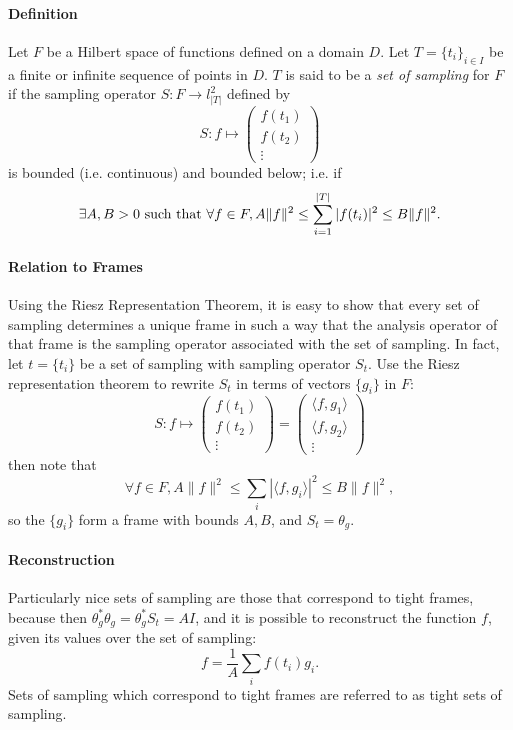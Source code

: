\documentclass[12pt]{article}
\begin{document}
\paragraph{Definition}
Let $F$ be a Hilbert space of functions defined on a domain $D$. Let $T = \{t_i\}_{i\in I}$ be a finite or infinite sequence of points in $D$. $T$ is said to be a \emph{set of sampling} for $F$ if the sampling operator $S: F \rightarrow l^2_{|T|}$ defined by 
$$ 
S: f \mapsto 
\begin{pmatrix}
f(t_1) \\
f(t_2) \\
\vdots 
\end{pmatrix}
$$
is bounded (i.e. continuous) and bounded below; i.e. if 
$$\exists A,B>0 \hbox{ such that } \forall f \in F, A\|f\|^2 \leq \sum_{i=1}^{|T|} |f(t_i)|^2 \leq B \|f\|^2.$$

\paragraph{Relation to Frames}
Using the Riesz Representation Theorem, it is easy to show that every set of sampling determines a unique frame in such a way that the analysis operator of that frame is the sampling operator associated with the set of sampling. In fact, let $t=\{t_i\}$ be a set of sampling with sampling operator $S_t$. Use the Riesz representation theorem to rewrite $S_t$ in terms of vectors $\{g_i\}$ in $F$:
$$ 
S: f \mapsto 
\begin{pmatrix}
f(t_1) \\
f(t_2) \\
\vdots
\end{pmatrix}
=
\begin{pmatrix}
\langle f, g_1 \rangle \\
\langle f, g_2 \rangle \\
\vdots
\end{pmatrix}
$$
then note that 
$$ \forall f\in F, A\|f\|^2 \leq \sum_{i} \left| \langle f, g_i \rangle \right|^2 \leq B\|f\|^2, $$
so the $\{g_i\}$ form a frame with bounds $A, B$, and $S_t = \theta_g.$

\paragraph{Reconstruction}
Particularly nice sets of sampling are those that correspond to tight frames, because then $\theta_g^\ast\theta_g=\theta_g^\ast S_t=AI$, and it is possible to reconstruct the function $f$, given its values over the set of sampling:
$$ f = \frac{1}{A}\sum_i f(t_i) g_i.$$
Sets of sampling which correspond to tight frames are referred to as tight sets of sampling.
\end{document}
